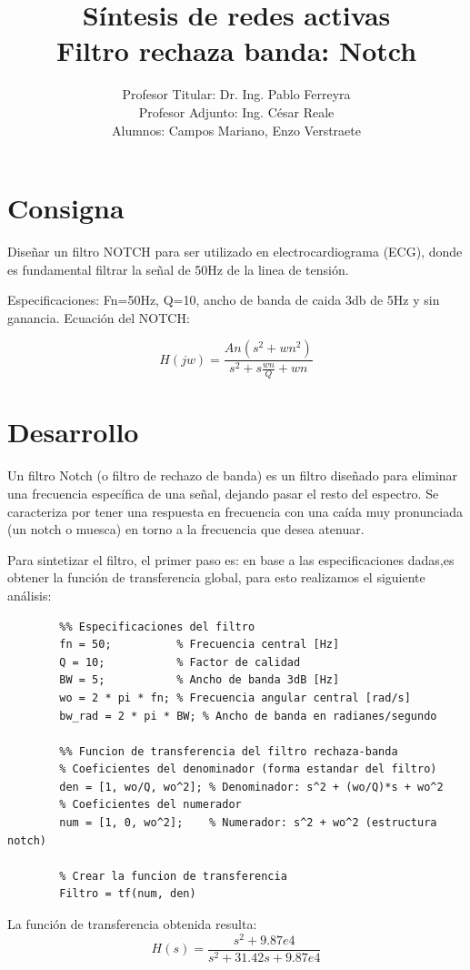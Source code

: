 \documentclass[12pt]{article}
\title{Síntesis de redes activas \\ Filtro rechaza banda: Notch}
\author{Profesor Titular: Dr. Ing. Pablo Ferreyra \\  Profesor Adjunto: Ing. César Reale \\ Alumnos: Campos Mariano,	Enzo Verstraete}
\begin{document}
	\maketitle
	\newpage
	\section{Consigna}
	Diseñar un filtro NOTCH para ser utilizado en electrocardiograma (ECG), donde es fundamental
	filtrar la señal de 50Hz de la linea de tensión.
	
	Especificaciones: Fn=50Hz, Q=10, ancho de banda de caida 3db de 5Hz y sin ganancia.
	Ecuación del NOTCH:
	
	\begin{equation}
		H(jw)=\frac{An(s^2+wn^2)}{s^2+s\frac{wn}{Q}+wn}
	\end{equation}
	
	
	\section{Desarrollo}
	Un filtro Notch (o filtro de rechazo de banda) es un filtro diseñado para eliminar una frecuencia específica de una señal, dejando pasar el resto del espectro. Se caracteriza por tener una respuesta en frecuencia con una caída muy pronunciada (un notch o muesca) en torno a la frecuencia que desea atenuar.
	
	Para sintetizar el filtro, el primer paso es: en base a las especificaciones dadas,es obtener la función de transferencia global, para esto realizamos el siguiente análisis:
	
	\begin{lstlisting}
		%% Especificaciones del filtro
		fn = 50;          % Frecuencia central [Hz]
		Q = 10;           % Factor de calidad
		BW = 5;           % Ancho de banda 3dB [Hz]
		wo = 2 * pi * fn; % Frecuencia angular central [rad/s]
		bw_rad = 2 * pi * BW; % Ancho de banda en radianes/segundo
		
		%% Funcion de transferencia del filtro rechaza-banda
		% Coeficientes del denominador (forma estandar del filtro)
		den = [1, wo/Q, wo^2]; % Denominador: s^2 + (wo/Q)*s + wo^2
		% Coeficientes del numerador
		num = [1, 0, wo^2];    % Numerador: s^2 + wo^2 (estructura notch)
		
		% Crear la funcion de transferencia
		Filtro = tf(num, den)
	\end{lstlisting}
	
	La función de transferencia obtenida resulta:
	\begin{equation}
		H(s)=\frac{s^2+9.87e4}{s^2+31.42s+9.87e4}
	\end{equation}
	
\end{document}
